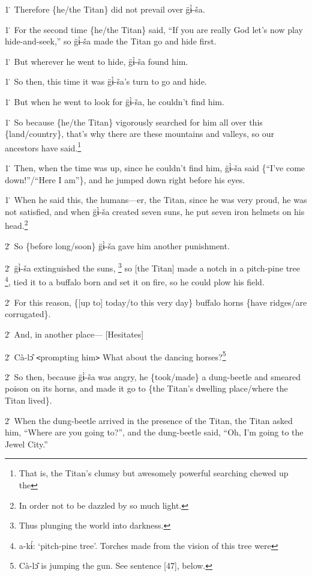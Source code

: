 1\. Therefore \{he/the Titan\} did not prevail over g̈ɨ̀-ša.

1\. For the second time \{he/the Titan\} said, ``If you are really God let's now
play hide-and-seek,'' so g̈ɨ̀-ša made the Titan go and hide first.

1\. But wherever he went to hide, g̈ɨ̀-ša found him.

1\. So then, this time it was g̈ɨ̀-ša's turn to go and hide.

1\. But when he went to look for g̈ɨ̀-ša, he couldn't find him.

1\. So because \{he/the Titan\} vigorously searched for him all over this \{land/country\},
that's why there are these mountains and valleys, so our ancestors have said.\footnote{That is, the Titan's clumsy but awesomely powerful searching chewed up the}

1\. Then, when the time was up, since he couldn't find him, g̈ɨ̀-ša said \{``I've
come down!''/``Here I am''\}, and he jumped down right before his eyes.

1\. When he said this, the humans---er, the Titan, since he was very proud, he
was not satisfied, and when g̈ɨ̀-ša created seven suns, he put seven iron helmets
on his head.\footnote{In order not to be dazzled by so much light.}

2\. So \{before long/soon\} g̈ɨ̀-ša gave him another punishment.

2\. g̈ɨ̀-ša extinguished the suns, \footnote{Thus plunging the world into darkness.} so [the Titan] made a notch in a pitch-pine
tree \footnote{a-kɨ́: `pitch-pine tree'. Torches made from the vision of this tree were}, tied it to a buffalo born and set it on fire, so he could plow his field.

2\. For this reason, \{[up to] today/to this very day\} buffalo horns \{have ridges/are
corrugated\}.

2\. And, in another place--- [Hesitates]

2\. Cà-lɔ̂ \texttt{<}prompting him\texttt{>} What about the dancing horses?\footnote{Cà-lɔ̂ is jumping the gun. See sentence [47], below.}

2\. So then, because g̈ɨ̀-ša was angry, he \{took/made\} a dung-beetle and
smeared poison on its horns, and made it go to \{the Titan's dwelling place/where
the Titan lived\}.

2\. When the dung-beetle arrived in the presence of the Titan, the Titan asked
him, ``Where are you going to?'', and the dung-beetle said, ``Oh, I'm going to
the Jewel City.''

